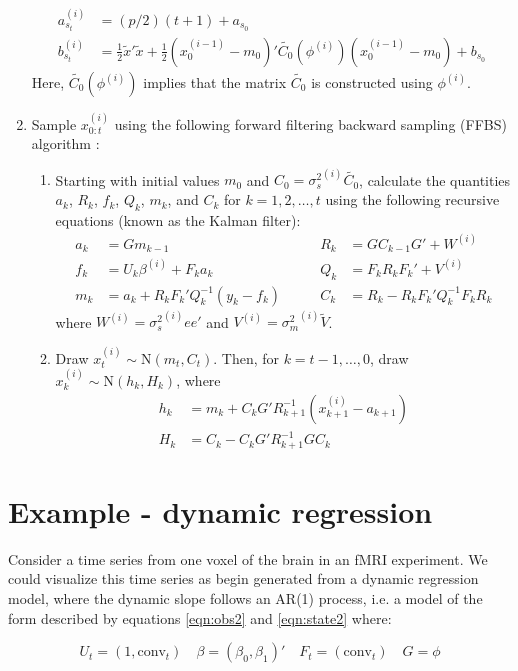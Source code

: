 \documentclass{article}
\begin{document}
\begin{enumerate}
\begin{align*}
a_{s_t}^{(i)} &= (p/2)(t+1) + a_{s_0} \\
b_{s_t}^{(i)} &= \frac{1}{2}\tilde{x}'\tilde{x} + \frac{1}{2}(x_0^{(i-1)}-m_0)'\tilde{C_0}(\phi^{(i)})(x_0^{(i-1)}-m_0) + b_{s_0}
\end{align*}
\noindent Here, $\tilde{C_0}(\phi^{(i)})$ implies that the matrix $\tilde{C_0}$ is constructed using $\phi^{(i)}$.
\item Sample $x_{0:t}^{(i)}$ using the following forward filtering backward sampling (FFBS) algorithm \citep{petris2009dynamic}:
\begin{enumerate}
\item Starting with initial values $m_0$ and $C_0 = {\sigma^2_s}^{(i)}\tilde{C_0}$, calculate the quantities $a_k$, $R_k$, $f_k$, $Q_k$, $m_k$, and $C_k$ for $k = 1,2,\ldots,t$ using the following recursive equations (known as the Kalman filter):
    \begin{align*}
    a_k &= Gm_{k-1} &\qquad R_k &= GC_{k-1}G' + W^{(i)} \\
    f_k &= U_k\beta^{(i)} + F_ka_k &\qquad Q_k &= F_kR_kF_k' + V^{(i)} \\
    m_k &= a_k + R_kF_k'Q_k^{-1}(y_k-f_k) &\qquad C_k &= R_k - R_kF_k'Q_k^{-1}F_kR_k
    \end{align*}
    \noindent where $W^{(i)} = {\sigma^2_s}^{(i)}ee'$ and $V^{(i)} = {\sigma^2_m}^{(i)}\tilde{V}$.
\item Draw $x_t^{(i)} \sim \mbox{N}(m_t,C_t)$. Then, for $k = t-1,\ldots,0$, draw $x_k^{(i)} \sim \mbox{N}(h_k,H_k)$, where
    \begin{align*}
    h_k &= m_k + C_kG'R_{k+1}^{-1}(x_{k+1}^{(i)} - a_{k+1}) \\
    H_k &= C_k - C_kG'R_{k+1}^{-1}GC_k
    \end{align*}
\end{enumerate}
\end{enumerate}

\section{Example - dynamic regression} \label{sec:exdr}

Consider a time series from one voxel of the brain in an fMRI experiment. We could visualize this time series as begin generated from a dynamic regression model, where the dynamic slope follows an AR(1) process, i.e. a model of the form described by equations \eqref{eqn:obs2} and \eqref{eqn:state2} where:

\begin{equation}
U_t = (1, \mbox{conv}_t) \quad \beta = (\beta_0,\beta_1)' \quad F_t = (\mbox{conv}_t) \quad G = \phi \label{eqn:dr}
\end{equation}
\end{document}
